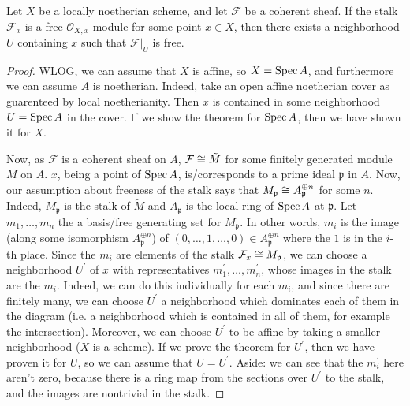 \begin{theorem}
	\label{thm:stalk_free_implies_locally_free}

	Let \(X\) be a locally noetherian scheme, and let
	\(\mathcal{F}\) be a coherent sheaf. 
	If the stalk \(\mathcal{F}_{x}\) is a free
	\(\mathcal{O}_{X,x} \)-module for some point
	\(x \in X\), then there exists
	a neighborhood \(U\) containing \(x\) such that
	\(\mathcal{F}|_{U}\) is free.
\end{theorem}

\begin{proof}
	WLOG, we can assume that \(X\) is affine, so 
	\(X = \operatorname{Spec} A\), and furthermore we can assume
	\(A\) is noetherian.
	Indeed, take an open affine noetherian cover 
	as guarenteed by local noetherianity. 
	Then \(x\) is contained in some neighborhood
	\(U = \operatorname{Spec} A\) in the cover. 
	If we show the theorem for \(\operatorname{Spec} A\),
	then we have shown it for \(X\).

	Now, as \(\mathcal{F}\) is a coherent sheaf on 
	\(A\), \(\mathcal{F} \cong \tilde{M}\) for some
	finitely generated module \(M\) on \(A\).
	\(x\), being a point of \(\operatorname{Spec} A\), 
	is/corresponds to a prime
	ideal \(\mathfrak{p}\) in \(A\).
	Now, our assumption about
	freeness of the stalk says that
	\(M_{\mathfrak{p}} \cong A_{\mathfrak{p}}^{\oplus n}\) 
	for some \(n\).
	Indeed, \(M_{\mathfrak{p}}\) is the stalk of 
	\(\tilde{M}\) and \(A_{\mathfrak{p}}\) is the local
	ring of \(\operatorname{Spec} A\) at \(\mathfrak{p}\).
	Let \(m_{1} , \ldots , m_{n}\) the a 
	basis/free generating set for \(M_{\mathfrak{p}}\).
	In other words, \(m_{i}\) is the image 
	(along
	some isomorphism \(A_{\mathfrak{p}}^{\oplus n}\)) of
	\((0, \ldots, 1, \ldots, 0) \in A_{\mathfrak{p}}^{\oplus n}\)
	where the \(1\) is in the \(i\)-th place.
	Since the \(m_{i}\) are elements of the stalk 
	\(\mathcal{F}_{x} \cong M_{\mathfrak{p}}\),
	we can choose a neighborhood \(U^{\prime}\) of \(x\) with 
	representatives \(m_{1}^{\prime}, \ldots, m_{n}^{\prime}\),
	whose images in the stalk are the \(m_{i}\).
	Indeed, we can do this individually for each \(m_{i}\),
	and since there are finitely many, 
	we can choose \(U^{\prime}\) a neighborhood which dominates each of them in 
	the diagram (i.e. a neighborhood which is contained in
	all of them, for example the intersection).
	Moreover, we can choose \(U^{\prime}\) to be affine by taking a 
	smaller neighborhood (\(X\) is a scheme).
	If we prove the theorem for \(U^{\prime}\), then we 
	have proven it for \(U\),
	so we can assume that \(U = U^{\prime}\).
	Aside: we can see that the \(m_{i}^{\prime}\) here aren't
	zero, because there is a ring map from the sections over
	\(U^{\prime}\) to the stalk, and the images are nontrivial in the stalk.



\end{proof}
